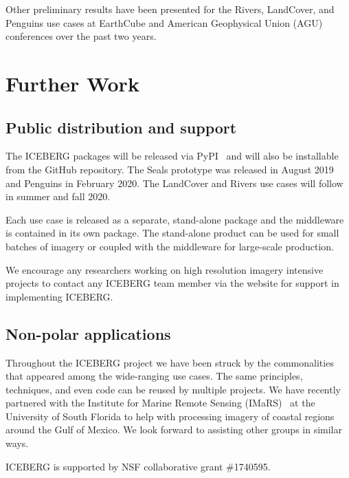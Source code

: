 \documentclass[manuscript,screen]{acmart}
\begin{document}
Other preliminary results have been presented for the Rivers, LandCover, and Penguins use cases at EarthCube and American Geophysical Union (AGU) conferences over the past two years.
\section{Further Work}
\subsection{Public distribution and support}
The ICEBERG packages will be released via PyPI~\cite{pypiweb:20} and will also be installable from the GitHub repository.  The Seals prototype was released in August 2019 and Penguins in February 2020.  The LandCover and Rivers use cases 
will follow in summer and fall 2020.

Each use case is released as a separate, stand-alone package and the 
middleware is contained in its own package.  The stand-alone product can be used for small batches of imagery or coupled with the middleware for
large-scale production.

We encourage any researchers working on high resolution imagery intensive projects to contact any ICEBERG team member via the website for support in implementing ICEBERG. 

\subsection{Non-polar applications}
Throughout the ICEBERG project we have been struck by the commonalities that
appeared among the wide-ranging use cases.  The same principles, techniques,
and even code can be reused by multiple projects.  We have recently partnered with 
the Institute for Marine Remote Sensing (IMaRS)~\cite{imarsweb:20} at
the University of South Florida to help with processing imagery of coastal
regions around the Gulf of Mexico.  We look forward to assisting other
groups in similar ways. 
\begin{acks}
	ICEBERG is supported by NSF collaborative grant \#1740595.
\end{acks}




\end{document}
